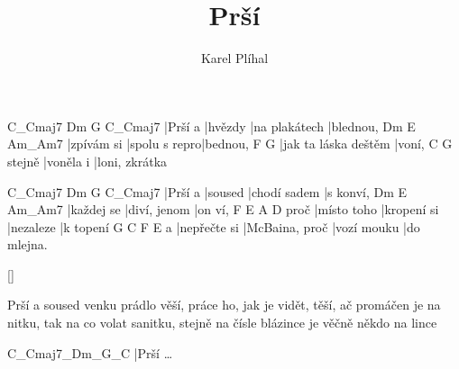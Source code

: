 \documentclass{song}
\title{Prší}
\author{Karel Plíhal}
\begin{document}
C_Cmaj7 Dm      G             C_Cmaj7
|Prší a |hvězdy |na plakátech |blednou,
Dm         E             Am_Am7
|zpívám si |spolu s repro|bednou,
F                    G
|jak ta láska deštěm |voní,
       C         G
stejně |voněla i |loni, zkrátka
\endstrophe

\strophe
C_Cmaj7 Dm      G            C_Cmaj7
|Prší a |soused |chodí sadem |s konví,
Dm         E            Am_Am7
|každej se |diví, jenom |on ví,
     F           E           A         D
proč |místo toho |kropení si |nezaleze |k topení
  G            C              F           E
a |nepřečte si |McBaina, proč |vozí mouku |do mlejna.
\endstrophe

\ref{}

\strophe*
Prší a soused venku prádlo věší,
práce ho, jak je vidět, těší,
ač promáčen je na nitku, tak na co volat sanitku,
stejně na čísle blázince je věčně někdo na lince
\endstrophe

\strophe
C_Cmaj7_Dm_G_C
|Prší \ldots
\endstrophe
\end{document}
